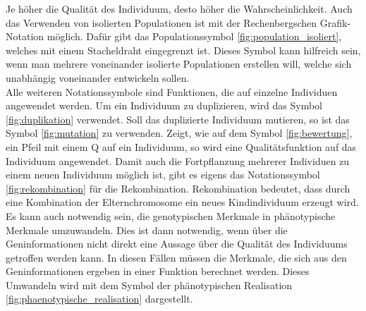 Je höher die Qualität des Individuum, desto höher die Wahrscheinlichkeit. Auch das Verwenden von isolierten Populationen ist mit der Rechenbergschen Grafik-Notation möglich. Dafür gibt das Populationssymbol \ref{fig:population_isoliert}, welches mit einem Stacheldraht eingegrenzt ist. Dieses Symbol kann hilfreich sein, wenn man mehrere voneinander isolierte Populationen erstellen will, welche sich unabhängig voneinander entwickeln sollen.\\
Alle weiteren Notationssymbole sind Funktionen, die auf einzelne Individuen angewendet werden. Um ein Individuum zu duplizieren, wird das Symbol \ref{fig:duplikation} verwendet. Soll das duplizierte Individuum mutieren, so ist das Symbol \ref{fig:mutation} zu verwenden. Zeigt, wie auf dem Symbol \ref{fig:bewertung}, ein Pfeil mit einem Q auf ein Individuum, so wird eine Qualitätsfunktion auf das Individuum angewendet. Damit auch die Fortpflanzung mehrerer Individuen zu einem neuen Individuum möglich ist, gibt es eigens das Notationssymbol \ref{fig:rekombination} für die Rekombination. Rekombination bedeutet, dass durch eine Kombination der Elternchromosome ein neues Kindindividuum erzeugt wird.
Es kann auch notwendig sein, die genotypischen Merkmale in phänotypische Merkmale umzuwandeln. Dies ist dann notwendig, wenn über die Geninformationen nicht direkt eine Aussage über die Qualität des Individuums getroffen werden kann. In diesen Fällen müssen die Merkmale, die sich aus den Geninformationen ergeben in einer Funktion berechnet werden. Dieses Umwandeln wird mit dem Symbol der phänotypischen Realisation \ref{fig:phaenotypische_realisation} dargestellt.

